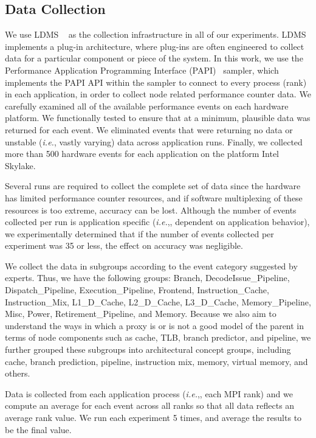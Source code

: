 \documentclass[conference]{IEEEtran}
\newcommand{\ie}                {\emph{i.e.},\xspace}
\begin{document}
\subsection{Data Collection}
\label{sec:collect}
We use LDMS ~\cite{ldms_sandia} as the collection infrastructure in all of our experiments. LDMS implements a plug-in architecture, where plug-ins are often engineered to collect data for a particular component or piece of the system. In this work, we use the Performance Application Programming Interface (PAPI)~\cite{terpstra2010collecting} sampler, which implements the PAPI API within the sampler to connect to every process (rank) in each application, in order to collect node related performance counter data. We carefully examined all of the available performance events on each hardware platform. We functionally tested to ensure that at a minimum, plausible data was returned for each event. We eliminated events that were returning no data or unstable (\ie vastly varying) data across application runs. Finally, we collected more than 500 hardware events for each application on the platform Intel Skylake. 

Several runs are required to collect the complete set of data since the hardware has limited performance counter resources, and if software multiplexing of these resources is too extreme, accuracy can be lost. Although the number of events collected per run is application specific (\ie, dependent on application behavior), we experimentally determined that if the number of events collected per experiment was 35 or less, the effect on accuracy was negligible. 

We collect the data in subgroups according to the event category suggested by experts. Thus, we have the following groups: Branch, DecodeIssue\_Pipeline, Dispatch\_Pipeline, Execution\_Pipeline, Frontend, Instruction\_Cache, Instruction\_Mix, L1\_D\_Cache, L2\_D\_Cache, L3\_D\_Cache, Memory\_Pipeline, Misc, Power, Retirement\_Pipeline, and Memory. Because we also aim to understand the ways in which a proxy is or is not a good model of the parent in terms of node components such as cache, TLB, branch predictor, and pipeline, we further grouped these subgroups into architectural concept groups, including cache, branch prediction, pipeline, instruction mix, memory, virtual memory, and others.

Data is collected from each application process (\ie, each MPI rank) and we compute an average for each event across all ranks so that all data reflects an average rank value. We run each experiment 5 times, and average the results to be the final value.
\end{document}
